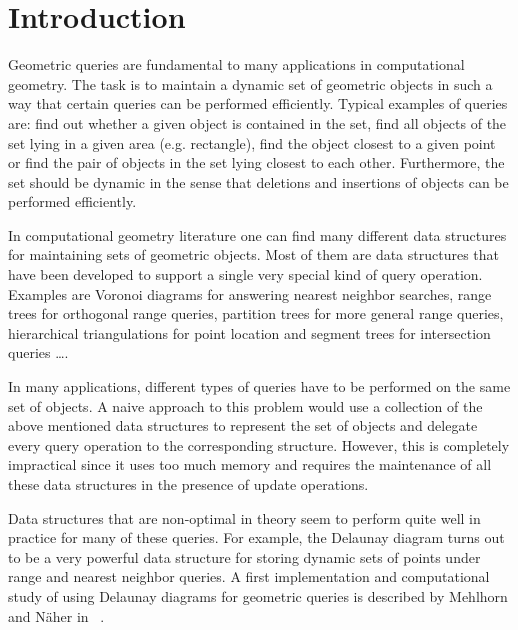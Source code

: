 


\section{Introduction}

Geometric queries are fundamental to many applications in computational
geometry. The task is to maintain a dynamic set of geometric objects
in such a way that certain queries can be performed efficiently.
Typical examples of queries are:
find out whether a given object is contained in the set,
find all objects of the set lying in a given area (e.g. rectangle),
find the object closest to a given point or
find the pair of objects in the set lying closest to each other. 
Furthermore, the set should be dynamic in the sense that deletions and 
insertions of objects can be performed efficiently.

In computational geometry literature one can find many different data structures for
maintaining sets of geometric objects. Most of them are data structures 
that have been developed to support a single very special kind of query 
operation.
Examples are Voronoi diagrams for answering nearest neighbor
searches, range trees for orthogonal range queries, partition trees
for more general range queries, hierarchical triangulations for point
location and segment trees for intersection queries \dots.

In many applications, different types of queries have to be
performed on the same set of objects. A naive approach to this
problem would use a collection of the above mentioned data structures to
represent the set of objects and delegate every query operation to
the corresponding structure.
However, this is completely impractical since it uses too much
memory and requires the maintenance of all these data structures in the presence of
update operations.

Data structures that are non-optimal in theory seem to perform quite well in
practice for many of these queries.
For example, the Delaunay diagram turns out to be a very powerful
data structure for storing dynamic sets of points under range and nearest
neighbor queries. A first implementation and computational
study of using Delaunay diagrams for geometric queries is described by
Mehlhorn and N\"aher in ~\cite{mn-lpcgc-00}.

